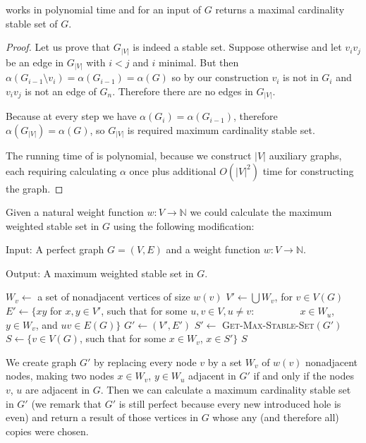 \begin{theorem}
   works in polynomial time and for an input of $G$ returns a maximal cardinality stable set of $G$.
\end{theorem}
\begin{proof}
  Let us prove that $G_{|V|}$ is indeed a stable set. Suppose otherwise and let $v_iv_j$ be an edge in $G_{|V|}$ with $i < j$ and $i$ minimal. But then $\alpha(G_{i-1} \setminus v_i) = \alpha(G_{i-1}) = \alpha(G)$ so by our construction $v_i$ is not in $G_i$ and $v_iv_j$ is not an edge of $G_n$. Therefore there are no edges in $G_{|V|}$.

  Because at every step we have $\alpha(G_i) = \alpha(G_{i-1})$, therefore $\alpha(G_{|V|}) = \alpha(G)$, so $G_{|V|}$ is required maximum cardinality stable set.
  
  The running time of  is polynomial, because we construct $|V|$ auxiliary graphs, each requiring calculating $\alpha$ once plus additional $O(|V|^2)$ time for constructing the graph.
\end{proof}

Given a natural weight function $w : V \rightarrow \mathbb{N}$ we could calculate the maximum weighted stable set in $G$ using the following modification: 

\begin{alg}
  \label{alg:maxWeightedStableSet}
  Input: A perfect graph $G = (V, E)$ and a weight function $w : V \rightarrow \mathbb{N}$.

  \noindent Output: A maximum weighted stable set in $G$.
\end{alg}

\begin{algorithmic}[1]
    \ls $W_v \gets$ a set of nonadjacent vertices of size $w(v)$
  \mEndFor
  \ls $V' \gets \bigcup W_v$, for $v \in V(G)$ 
  \ls $E' \gets \{xy$ for $x, y \in V'$, such that for some $u, v \in V, u \neq v$:
  \lsx~~~~~~~~ $x \in W_u$, $y \in W_v$, and $uv \in E(G)\}$
  \ls $G' \gets (V', E')$
  \ls $S' \gets$ \textsc{Get-Max-Stable-Set$(G')$}
  \ls $S \gets \{v \in V(G)$, such that for some $x\in W_v$, $x \in S'\}$
  \ls \RETURN $S$
  \mEndProcedure
\end{algorithmic}

We create graph $G'$ by replacing every node $v$ by a set $W_v$ of $w(v)$ nonadjacent nodes, making two nodes $x \in W_v$, $y \in W_u$ adjacent in $G'$ if and only if the nodes $v$, $u$ are adjacent in $G$. Then we can calculate a maximum cardinality stable set in $G'$ (we remark that $G'$ is still perfect because every new introduced hole is even) and return a result of those vertices in $G$ whose any (and therefore all) copies were chosen.

